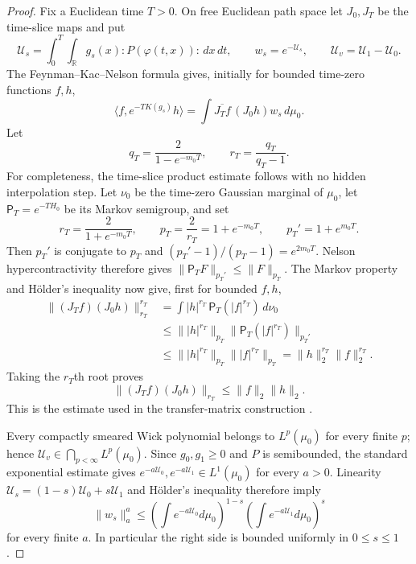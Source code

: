 \documentclass[11pt,a4paper]{article}
\theoremstyle{remark}
\newcommand{\R}{\mathbb R}
\begin{document}
\begin{proof}
Fix a Euclidean time $T>0$.  On free Euclidean path space let $J_0,J_T$ be the time-slice maps and
put
\[
 \mathcal U_s=\int_0^T\!\int_{\R}g_s(x):P(\varphi(t,x)):\,dx\,dt,
 \qquad w_s=e^{-\mathcal U_s},
 \qquad \mathcal U_v=\mathcal U_1-\mathcal U_0.
\]
The Feynman--Kac--Nelson formula gives, initially for bounded time-zero functions $f,h$,
\begin{equation}\label{eq:FKNpath}
 \langle f,e^{-TK(g_s)}h\rangle
 =\int \overline{J_Tf}\,(J_0h)w_s\,d\mu_0.                    \tag{4.3}
\end{equation}
Let
\[
 q_T=\frac{2}{1-e^{-m_0T}},\qquad r_T=\frac{q_T}{q_T-1}.
\]
For completeness, the time-slice product estimate follows with no hidden interpolation step.
Let $\nu_0$ be the time-zero Gaussian marginal of $\mu_0$, let
$\mathsf P_T=e^{-TH_0}$ be its Markov semigroup, and set
\[
 r_T=\frac{2}{1+e^{-m_0T}},\qquad
 p_T=\frac2{r_T}=1+e^{-m_0T},\qquad
 p_T'=1+e^{m_0T}.
\]
Then $p_T'$ is conjugate to $p_T$ and
$(p_T'-1)/(p_T-1)=e^{2m_0T}$.  Nelson hypercontractivity therefore gives
$\|\mathsf P_TF\|_{p_T'}\le\|F\|_{p_T}$.  The Markov property and H\"older's inequality now
give, first for bounded $f,h$,
\begin{align*}
 \|(J_Tf)(J_0h)\|_{r_T}^{r_T}
 &=\int |h|^{r_T}\,\mathsf P_T(|f|^{r_T})\,d\nu_0\\
 &\le \||h|^{r_T}\|_{p_T}
       \|\mathsf P_T(|f|^{r_T})\|_{p_T'}\\
 &\le \||h|^{r_T}\|_{p_T}\||f|^{r_T}\|_{p_T}
 =\|h\|_2^{r_T}\|f\|_2^{r_T}.
\end{align*}
Taking the $r_T$th root proves
\begin{equation}\label{eq:sliceproduct}
 \|(J_Tf)(J_0h)\|_{r_T}\le\|f\|_2\|h\|_2.                    \tag{4.4}
\end{equation}
This is the estimate used in the transfer-matrix construction
\cite[Thms.~V.10 and V.12]{Simon}.

Every compactly smeared Wick polynomial belongs to $L^p(\mu_0)$ for every finite $p$; hence
$\mathcal U_v\in\bigcap_{p<\infty}L^p(\mu_0)$.  Since $g_0,g_1\ge0$ and $P$ is semibounded, the
standard exponential estimate \cite[Thm.~V.7]{Simon} gives
$e^{-a\mathcal U_0},e^{-a\mathcal U_1}\in L^1(\mu_0)$ for every $a>0$.  Linearity
$\mathcal U_s=(1-s)\mathcal U_0+s\mathcal U_1$ and H\"older's inequality therefore imply
\begin{equation}\label{eq:weightbound}
 \|w_s\|_a^a
 \le\left(\int e^{-a\mathcal U_0}d\mu_0\right)^{1-s}
     \left(\int e^{-a\mathcal U_1}d\mu_0\right)^s             \tag{4.5}
\end{equation}
for every finite $a$.  In particular the right side is bounded uniformly in $0\le s\le1$.


\end{proof}
\end{document}
